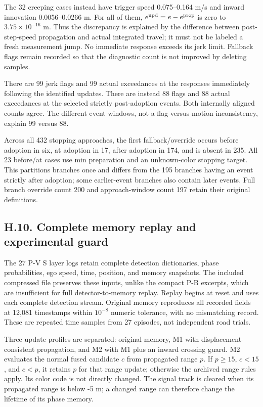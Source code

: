\documentclass[letterpaper,journal,onecolumn]{IEEEtran}
\begin{document}
The 32 creeping cases instead have trigger speed 0.075--0.164 m/s and inward innovation 0.0056--0.0266 m. For all of them, \(e^{\rm upd}=e-e^{\rm prop}\) is zero to \(3.75\times10^{-16}\) m. Thus the discrepancy is explained by the difference between post-step-speed propagation and actual integrated travel; it must not be labeled a fresh measurement jump. No immediate response exceeds its jerk limit. Fallback flags remain recorded so that the diagnostic count is not improved by deleting samples.

There are 99 jerk flags and 99 actual exceedances at the responses immediately following the identified updates. There are instead 88 flags and 88 actual exceedances at the selected strictly post-adoption events. Both internally aligned counts agree. The different event windows, not a flag-versus-motion inconsistency, explain 99 versus 88.

Across all 432 stopping approaches, the first fallback/override occurs before adoption in six, at adoption in 17, after adoption in 174, and is absent in 235. All 23 before/at cases use min preparation and an unknown-color stopping target. This partitions branches once and differs from the 195 branches having an event strictly after adoption; some earlier-event branches also contain later events. Full branch override count 200 and approach-window count 197 retain their original definitions.

\subsection*{H.10. Complete memory replay and experimental guard}

The 27 P-V S layer logs retain complete detection dictionaries, phase probabilities, ego speed, time, position, and memory snapshots. The included compressed file preserves these inputs, unlike the compact P-B excerpts, which are insufficient for full detector-to-memory replay. Replay begins at reset and uses each complete detection stream. Original memory reproduces all recorded fields at 12,081 timestamps within \(10^{-8}\) numeric tolerance, with no mismatching record. These are repeated time samples from 27 episodes, not independent road trials.

Three update profiles are separated: original memory, M1 with displacement-consistent propagation, and M2 with M1 plus an inward crossing guard. M2 evaluates the normal fused candidate \(c\) from propagated range \(p\). If \(p\ge15\), \(c<15\), and \(c<p\), it retains \(p\) for that range update; otherwise the archived range rules apply. Its color code is not directly changed. The signal track is cleared when its propagated range is below -5 m; a changed range can therefore change the lifetime of its phase memory.
\end{document}
